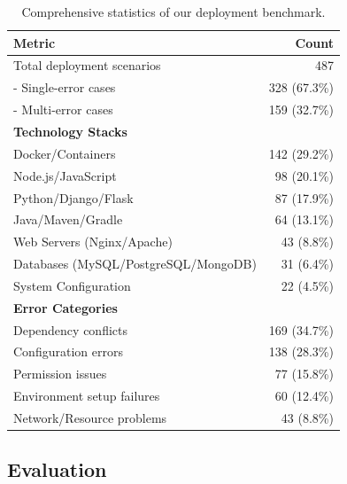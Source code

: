 \begin{table}[t]
\centering
\caption{Comprehensive statistics of our deployment benchmark.}
\label{tab:benchmark-stats}
\small
\begin{tabular}{@{}lr@{}}
\toprule
\textbf{Metric} & \textbf{Count} \\
\midrule
Total deployment scenarios & 487 \\
\quad - Single-error cases & 328 (67.3\%) \\
\quad - Multi-error cases & 159 (32.7\%) \\
\midrule
\textbf{Technology Stacks} & \\
\quad Docker/Containers & 142 (29.2\%) \\
\quad Node.js/JavaScript & 98 (20.1\%) \\
\quad Python/Django/Flask & 87 (17.9\%) \\
\quad Java/Maven/Gradle & 64 (13.1\%) \\
\quad Web Servers (Nginx/Apache) & 43 (8.8\%) \\
\quad Databases (MySQL/PostgreSQL/MongoDB) & 31 (6.4\%) \\
\quad System Configuration & 22 (4.5\%) \\
\midrule
\textbf{Error Categories} & \\
\quad Dependency conflicts & 169 (34.7\%) \\
\quad Configuration errors & 138 (28.3\%) \\
\quad Permission issues & 77 (15.8\%) \\
\quad Environment setup failures & 60 (12.4\%) \\
\quad Network/Resource problems & 43 (8.8\%) \\
\midrule

\end{tabular}
\end{table}







\subsection{Evaluation}

